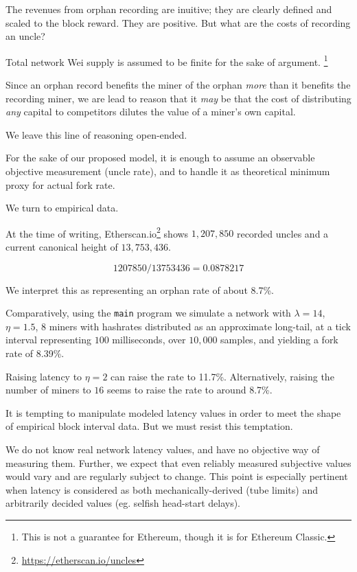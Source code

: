 \documentclass[11pt]{article}
\theoremstyle{plain}
\begin{document}
{The revenues from orphan recording are inuitive; they are clearly defined and
scaled to the block reward. They are positive. But what are the costs of
recording an uncle?

Total network Wei supply is assumed to be finite for the sake of
argument.\nolinebreak
\footnote{This is not a guarantee for Ethereum, though it is for Ethereum Classic.}

Since an orphan record benefits the miner of the orphan \emph{more} than it
benefits the recording miner, we are lead to reason that it \emph{may} be that the
cost of distributing \emph{any} capital to competitors dilutes the value of a
miner's own capital.

We leave this line of reasoning open-ended.

For the sake of our proposed model, it is enough to assume an observable
objective measurement (uncle rate), and to handle it as theoretical minimum
proxy for actual fork rate.

We turn to empirical data.

At the time of writing, Etherscan.io\footnote{\url{https://etherscan.io/uncles}}
shows $1,207,850$ recorded uncles and a current canonical height of $13,753,436$. 

\begin{equation}
  1207850 / 13753436 = 0.0878217
\end{equation}

We interpret this as representing an orphan rate of about 8.7\%. 

Comparatively, using the \texttt{main} program we simulate a network with
$\lambda=14$, $\eta=1.5$, $8$ miners with hashrates distributed as an
approximate long-tail, at a tick interval representing $100$ milliseconds, over
$10,000$ samples, and yielding a fork rate of 8.39\%. 

Raising latency to $\eta=2$ can raise the rate to 11.7\%.
Alternatively, raising the number of miners to $16$ seems to raise the rate to
around 8.7\%.

It is tempting to manipulate modeled latency values in order to meet the
shape of empirical block interval data. But we must resist this temptation.

We do not know real network latency values, and have no objective way of
measuring them. Further, we expect that even reliably measured subjective values
would vary and are regularly subject to change. This point is especially
pertinent when latency is considered as both mechanically-derived (tube limits) and
arbitrarily decided values (eg. selfish head-start delays).

}
\end{document}
